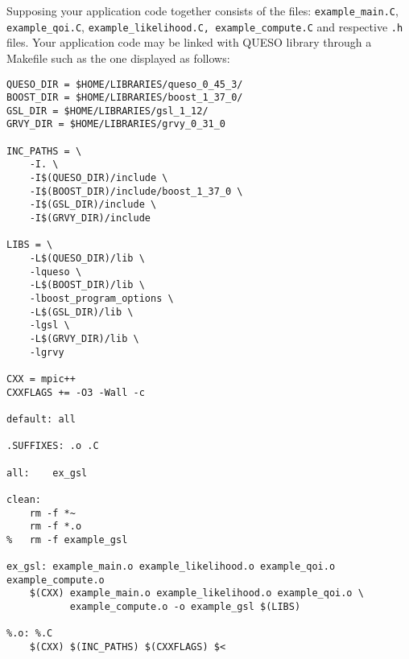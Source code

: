 Supposing your application code together consists of the files: \linebreak \verb+example_main.C+, \verb+example_qoi.C+,  \verb+example_likelihood.C, example_compute.C+ and respective \verb+.h+ files. Your application code may be linked with QUESO library through a Makefile such as the one displayed as follows:

\begin{lstlisting}[label={},caption={},deletekeywords={export,rm}]
QUESO_DIR = $HOME/LIBRARIES/queso_0_45_3/
BOOST_DIR = $HOME/LIBRARIES/boost_1_37_0/
GSL_DIR = $HOME/LIBRARIES/gsl_1_12/
GRVY_DIR = $HOME/LIBRARIES/grvy_0_31_0

INC_PATHS = \
	-I. \
	-I$(QUESO_DIR)/include \
	-I$(BOOST_DIR)/include/boost_1_37_0 \
	-I$(GSL_DIR)/include \
	-I$(GRVY_DIR)/include 

LIBS = \
	-L$(QUESO_DIR)/lib \
	-lqueso \
	-L$(BOOST_DIR)/lib \
	-lboost_program_options \
	-L$(GSL_DIR)/lib \
	-lgsl \
	-L$(GRVY_DIR)/lib \
	-lgrvy 

CXX = mpic++
CXXFLAGS += -O3 -Wall -c

default: all

.SUFFIXES: .o .C

all:	ex_gsl

clean:
	rm -f *~
	rm -f *.o
% 	rm -f example_gsl

ex_gsl: example_main.o example_likelihood.o example_qoi.o example_compute.o
	$(CXX) example_main.o example_likelihood.o example_qoi.o \
	       example_compute.o -o example_gsl $(LIBS)

%.o: %.C
	$(CXX) $(INC_PATHS) $(CXXFLAGS) $<
\end{lstlisting}
% 
